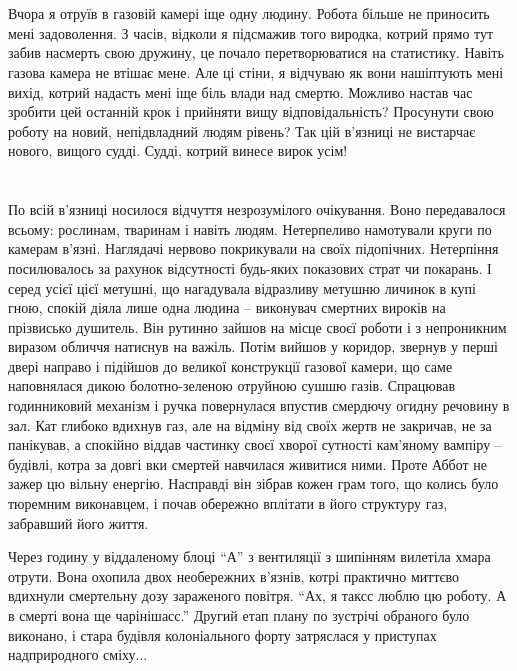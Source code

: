 \documentclass[a4paper,oneside]{book}
\begin{document}
\section*{}
 
Вчора я отруїв в газовій камері іще одну людину. Робота більше не приносить
мені задоволення. З часів, відколи я підсмажив того виродка, котрий прямо тут
забив насмерть свою дружину, це почало перетворюватися на статистику. Навіть
газова камера не втішає мене. Але ці стіни, я відчуваю як вони нашіптують мені
вихід, котрий надасть мені іще біль влади над смертю. Можливо настав час
зробити цей останній крок і прийняти вищу відповідальність? Просунути свою
роботу на новий, непідвладний людям рівень? Так цій в’язниці не вистарчає
нового, вищого судді. Судді, котрий винесе вирок усім!

\section*{}
 
По всій в’язниці носилося відчуття незрозумілого очікування. Воно передавалося
всьому: рослинам, тваринам і навіть людям. Нетерпеливо намотували круги по
камерам в’язні. Наглядачі нервово покрикували на своїх підопічних. Нетерпіння
посилювалось за рахунок відсутності будь-яких показових страт чи покарань. І
серед усієї цієї метушні, що нагадувала відразливу метушню личинок в купі
гною, спокій діяла лише одна людина – виконувач смертних вироків на прізвисько
душитель. Він рутинно зайшов на місце своєї роботи і з непроникним виразом
обличчя натиснув на важіль. Потім вийшов у коридор, звернув у перші двері
направо і підійшов до великої конструкції газової камери, що саме наповнялася
дикою болотно-зеленою отруйною сушшю газів. Спрацював годинниковий механізм і
ручка повернулася впустив смердючу огидну речовину в зал. Кат глибоко вдихнув
газ, але на відміну від своїх жертв не закричав, не за панікував, а спокійно
віддав частинку своєї хворої сутності кам’яному вампіру – будівлі, котра за
довгі вки смертей навчилася живитися ними. Проте Аббот не зажер цю вільну
енергію. Насправді він зібрав кожен грам того, що колись було тюремним
виконавцем, і почав обережно вплітати в його структуру газ, забравший його
життя.

Через годину у віддаленому блоці “А” з вентиляції з шипінням  вилетіла хмара
отрути. Вона охопила двох необережних в’язнів, котрі практично миттєво
вдихнули смертельну дозу зараженого повітря. “Ах, я таксс люблю цю роботу. А в
смерті вона ще чарінішасс.” Другий етап плану по зустрічі обраного було
виконано, і стара будівля колоніального форту затряслася у приступах
надприродного сміху...
\end{document}
